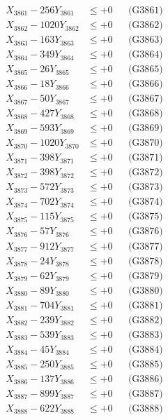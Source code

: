 \documentclass[a4paper,10pt]{article}
\begin{document}
{\begin{align}
\allowbreak
X_{3861} - 256Y_{3861} &\leq +0 && \text{(G3861)} \\
X_{3862} - 1020Y_{3862} &\leq +0 && \text{(G3862)} \\
X_{3863} - 163Y_{3863} &\leq +0 && \text{(G3863)} \\
X_{3864} - 349Y_{3864} &\leq +0 && \text{(G3864)} \\
X_{3865} - 26Y_{3865} &\leq +0 && \text{(G3865)} \\
X_{3866} - 18Y_{3866} &\leq +0 && \text{(G3866)} \\
X_{3867} - 50Y_{3867} &\leq +0 && \text{(G3867)} \\
X_{3868} - 427Y_{3868} &\leq +0 && \text{(G3868)} \\
X_{3869} - 593Y_{3869} &\leq +0 && \text{(G3869)} \\
X_{3870} - 1020Y_{3870} &\leq +0 && \text{(G3870)} \\
\allowbreak
X_{3871} - 398Y_{3871} &\leq +0 && \text{(G3871)} \\
X_{3872} - 398Y_{3872} &\leq +0 && \text{(G3872)} \\
X_{3873} - 572Y_{3873} &\leq +0 && \text{(G3873)} \\
X_{3874} - 702Y_{3874} &\leq +0 && \text{(G3874)} \\
X_{3875} - 115Y_{3875} &\leq +0 && \text{(G3875)} \\
X_{3876} - 57Y_{3876} &\leq +0 && \text{(G3876)} \\
X_{3877} - 912Y_{3877} &\leq +0 && \text{(G3877)} \\
X_{3878} - 24Y_{3878} &\leq +0 && \text{(G3878)} \\
X_{3879} - 62Y_{3879} &\leq +0 && \text{(G3879)} \\
X_{3880} - 89Y_{3880} &\leq +0 && \text{(G3880)} \\
\allowbreak
X_{3881} - 704Y_{3881} &\leq +0 && \text{(G3881)} \\
X_{3882} - 239Y_{3882} &\leq +0 && \text{(G3882)} \\
X_{3883} - 539Y_{3883} &\leq +0 && \text{(G3883)} \\
X_{3884} - 45Y_{3884} &\leq +0 && \text{(G3884)} \\
X_{3885} - 250Y_{3885} &\leq +0 && \text{(G3885)} \\
X_{3886} - 137Y_{3886} &\leq +0 && \text{(G3886)} \\
X_{3887} - 899Y_{3887} &\leq +0 && \text{(G3887)} \\
X_{3888} - 622Y_{3888} &\leq +0 && \text{(G3888)} \\

\end{align}}
\end{document}
